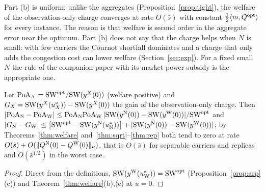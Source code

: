 Part (b) is uniform: unlike the aggregates (Proposition~\ref{prop:tight}), the welfare of the observation-only charge converges at rate $O(\bar s)$ with constant $\tfrac12\langle m,Q^{\mathrm{opt}}\rangle$ for every instance. The reason is that welfare is second order in the aggregate error near the optimum. Part (b) does not say that the charge helps when $N$ is small: with few carriers the Cournot shortfall dominates and a charge that only adds the congestion cost can lower welfare (Section~\ref{sec:exp}). For a fixed small $N$ the rule of the companion paper with its market-power subsidy is the appropriate one.

\begin{corollary}\label{cor:poa}
Let $\mathrm{PoA}_X=\mathrm{SW}^{\mathrm{opt}}/\mathrm{SW}(y^X(0))$ (welfare positive) and $G_X=\mathrm{SW}(y^X(u_X^*))-\mathrm{SW}(y^X(0))$ the gain of the observation-only charge. Then $|\mathrm{PoA}_{\mathrm{N}}-\mathrm{PoA}_{\mathrm{W}}|\le\mathrm{PoA}_{\mathrm{N}}\mathrm{PoA}_{\mathrm{W}}\,|\mathrm{SW}(y^{\mathrm{N}}(0))-\mathrm{SW}(y^{\mathrm{W}}(0))|/\mathrm{SW}^{\mathrm{opt}}$ and $|G_{\mathrm{N}}-G_{\mathrm{W}}|\le\big[\mathrm{SW}^{\mathrm{opt}}-\mathrm{SW}(y^{\mathrm{N}}(u_{\mathrm{N}}^*))\big]+|\mathrm{SW}(y^{\mathrm{N}}(0))-\mathrm{SW}(y^{\mathrm{W}}(0))|$; by Theorems~\ref{thm:welfare} and~\ref{thm:sqrt}--\ref{thm:rep} both tend to zero at rate $O(\bar s)+O(\lVert Q^{\mathrm{N}}(0)-Q^{\mathrm{W}}(0)\rVert_\kappa)$, that is $O(\bar s)$ for separable carriers and replicas and $O(\bar s^{1/2})$ in the worst case.
\end{corollary}
\begin{proof}
Direct from the definitions, $\mathrm{SW}(y^{\mathrm{W}}(u_{\mathrm{W}}^*))=\mathrm{SW}^{\mathrm{opt}}$ (Proposition~\ref{prop:arp}(c)) and Theorem~\ref{thm:welfare}(b),(c) at $u=0$.
\end{proof}
